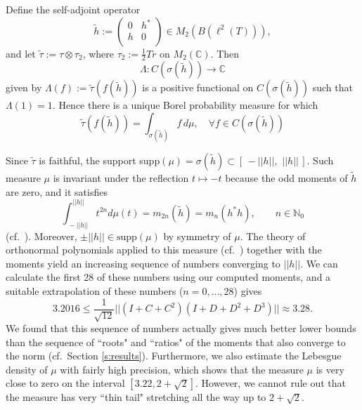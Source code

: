 \documentclass{amsart}
\newcommand{\C}{\mathbb C}
\newcommand{\R}{\mathbb R}
\newcommand{\N}{\mathbb N}
\theoremstyle{definition}
\begin{document}
Define the self-adjoint operator
$$\tilde h:=\left(
\begin{array}{cc}
 0 & h^* \\
 h & 0 \\
\end{array}
\right)\in M_2(B(\ell^2(T))),
$$
and let $\tilde \tau :=\tau\otimes \tau_2$, where $\tau_2:=\frac12Tr$ on $M_2(\C)$.
Then 
$$\Lambda:C(\sigma(\tilde h))\to \C$$
given by $\Lambda(f):=\tilde \tau(f(\tilde h))$ is a positive functional on $C(\sigma(\tilde h))$ such that $\Lambda(1)=1$.
Hence there is a unique Borel probability measure for which
$$\tilde\tau(f(\tilde h)) =\int_{\sigma(\tilde h)} f\,d\mu,\quad \forall f\in C(\sigma(\tilde h))$$ 

Since $\tilde\tau$ is faithful, the support supp$(\mu)=\sigma(\tilde h)\subset[\,-||h||,\,\,||h||\,]$.
Such measure $\mu$ is invariant under the reflection $t\mapsto -t$ because the odd moments of $\tilde h$ are zero, and it satisfies
$$\int_{\,-||h||}^{||h||} t^{2n} d\mu(t)=m_{2n}(\tilde h)=m_n(h^*h),\qquad n\in\N_0$$
(cf.~\cite[Section 2]{HaagerupRamirezSolano}).
Moreover, $\pm||h||\in\mathrm{supp}(\mu)$ by symmetry of $\mu$. 
The theory of orthonormal polynomials applied to this measure  (cf.~\cite[Section 4]{HaagerupRamirezSolano}) together with the moments yield an increasing sequence of numbers converging to $||h||$.
We can calculate the first 28 of these numbers using our computed moments, and a suitable extrapolation of these numbers ($n=0,\ldots,28$) gives
$$3.2016\le\frac1{\sqrt{12}}||(I+C+C^2)(I+D+D^2+D^3)||\approx 3.28.$$ 
We found that this sequence of numbers actually gives much better lower bounds than the sequence of ``roots" and ``ratios" of the moments that also converge to the norm (cf.~Section \ref{s:results}). 
Furthermore, we also estimate the Lebesgue density of $\mu$ with fairly high precision, which shows that the measure $\mu$ is very close to zero on the interval $[3.22,2+\sqrt2]$. However, we cannot rule out that the measure has very ``thin tail" stretching all the way up to $2+\sqrt2$.
\end{document}
